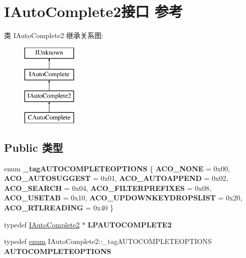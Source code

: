 \hypertarget{interface_i_auto_complete2}{}\section{I\+Auto\+Complete2接口 参考}
\label{interface_i_auto_complete2}
类 I\+Auto\+Complete2 继承关系图\+:\begin{figure}[H]
\begin{center}
\leavevmode
\includegraphics[height=4.000000cm]{interface_i_auto_complete2}
\end{center}
\end{figure}
\subsection*{Public 类型}
\begin{DoxyCompactItemize}
\item 
\mbox{\label{interface_i_auto_complete2_a201ccd7db77ea08734fbb8fd73f51050}} 
enum {\bfseries \+\_\+tag\+A\+U\+T\+O\+C\+O\+M\+P\+L\+E\+T\+E\+O\+P\+T\+I\+O\+NS} \{ \newline
{\bfseries A\+C\+O\+\_\+\+N\+O\+NE} = 0x00, 
{\bfseries A\+C\+O\+\_\+\+A\+U\+T\+O\+S\+U\+G\+G\+E\+ST} = 0x01, 
{\bfseries A\+C\+O\+\_\+\+A\+U\+T\+O\+A\+P\+P\+E\+ND} = 0x02, 
{\bfseries A\+C\+O\+\_\+\+S\+E\+A\+R\+CH} = 0x04, 
\newline
{\bfseries A\+C\+O\+\_\+\+F\+I\+L\+T\+E\+R\+P\+R\+E\+F\+I\+X\+ES} = 0x08, 
{\bfseries A\+C\+O\+\_\+\+U\+S\+E\+T\+AB} = 0x10, 
{\bfseries A\+C\+O\+\_\+\+U\+P\+D\+O\+W\+N\+K\+E\+Y\+D\+R\+O\+P\+S\+L\+I\+ST} = 0x20, 
{\bfseries A\+C\+O\+\_\+\+R\+T\+L\+R\+E\+A\+D\+I\+NG} = 0x40
 \}
\item 
\mbox{\label{interface_i_auto_complete2_a21350dc6d39b60e50fd5da206ddb37d5}} 
typedef \hyperlink{interface_i_auto_complete2}{I\+Auto\+Complete2} $\ast$ {\bfseries L\+P\+A\+U\+T\+O\+C\+O\+M\+P\+L\+E\+T\+E2}
\item 
\mbox{\label{interface_i_auto_complete2_a81d455f29359609cbf9288f725cc41e5}} 
typedef \hyperlink{interfaceenum}{enum} I\+Auto\+Complete2\+::\+\_\+tag\+A\+U\+T\+O\+C\+O\+M\+P\+L\+E\+T\+E\+O\+P\+T\+I\+O\+NS {\bfseries A\+U\+T\+O\+C\+O\+M\+P\+L\+E\+T\+E\+O\+P\+T\+I\+O\+NS}
\end{DoxyCompactItemize}
